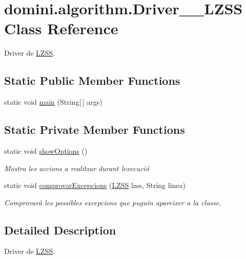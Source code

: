 \hypertarget{classdomini_1_1algorithm_1_1Driver____LZSS}{}\section{domini.\+algorithm.\+Driver\+\_\+\+\_\+\+L\+Z\+SS Class Reference}
\label{classdomini_1_1algorithm_1_1Driver____LZSS}


Driver de \hyperlink{classdomini_1_1algorithm_1_1LZSS}{L\+Z\+SS}.  


\subsection*{Static Public Member Functions}
\begin{DoxyCompactItemize}
\item 
static void \hyperlink{classdomini_1_1algorithm_1_1Driver____LZSS_ac1b8e15e184e7372a5ad2a76ac3b5d8c}{main} (String\mbox{[}$\,$\mbox{]} args)
\end{DoxyCompactItemize}
\subsection*{Static Private Member Functions}
\begin{DoxyCompactItemize}
\item 
static void \hyperlink{classdomini_1_1algorithm_1_1Driver____LZSS_a4362a21690fbdb3ef42dd6f8ca0f0da6}{show\+Options} ()
\begin{DoxyCompactList}\small\item\em Mostra les accions a realitzar durant l\textquotesingle{}execució \end{DoxyCompactList}\item 
static void \hyperlink{classdomini_1_1algorithm_1_1Driver____LZSS_a3b1983c6a71cd4d510e8434cd2e7f8f2}{comprovar\+Excepcions} (\hyperlink{classdomini_1_1algorithm_1_1LZSS}{L\+Z\+SS} lzss, String linea)
\begin{DoxyCompactList}\small\item\em Comprovarà les possibles excepcions que puguin apareixer a la classe. \end{DoxyCompactList}\end{DoxyCompactItemize}


\subsection{Detailed Description}
Driver de \hyperlink{classdomini_1_1algorithm_1_1LZSS}{L\+Z\+SS}. 


